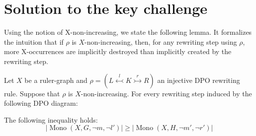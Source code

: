 \section{Solution to the key challenge}
\label{subgraph_counting:sec:solution_to_the_key_challenge}
Using the notion of X-non-increasing, we state the following lemma.
 It formalizes the intuition that if $\rho$ is $X$-non-increasing, then, for any rewriting step using $\rho$, 
more X-occurrences are implicitly destroyed than implicitly created by the rewriting step.
\begin{lemma} 
    \label{subgraph_counting:lem:w_u_l_not_geq_r_not}
        Let $X$ be a ruler-graph and $\rho \mathop{=} (L \overset{l}{\leftarrowtail} K \overset{r}{\rightarrowtail} R)$ an injective DPO rewriting rule.
        Suppose that $\rho$ is $X$-non-increasing. For every rewriting step induced by the following DPO diagram:
        \begin{center}
        \end{center}
       The following inequality holds:
        \[
            |\operatorname{Mono}(X, G, \lnot m, \lnot l')| \mathop{\geq} |\operatorname{Mono}(X, H, \lnot m', \lnot r')|
        \]
\end{lemma}
